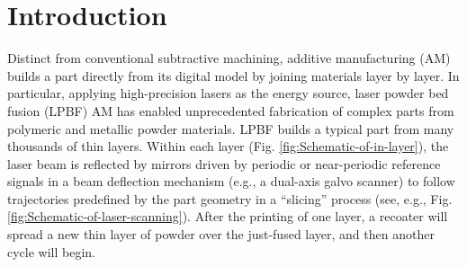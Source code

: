 \documentclass [11pt, proquest] {uwthesis}[2020/02/24]
\begin{document}
\chapter{Introduction} \label{chap:Background-and-Introduction}

Distinct from conventional subtractive machining, additive manufacturing
(AM) builds a part directly from its digital model by joining materials
layer by layer. In particular, applying high-precision lasers as the energy source, laser powder bed fusion (LPBF) AM has enabled
unprecedented fabrication of complex parts from polymeric and metallic
powder materials. LPBF builds a typical part from many thousands of thin layers. Within
each layer (Fig. \ref{fig:Schematic-of-in-layer}), the laser beam is reflected by mirrors driven by periodic or near-periodic reference signals in a beam deflection mechanism (e.g., a dual-axis
galvo scanner) to follow trajectories predefined by the part geometry
in a ``slicing'' process (see, e.g., Fig. \ref{fig:Schematic-of-laser-scanning}). After the printing of one layer, a recoater
will spread a new thin layer of powder over the just-fused layer,
and then another cycle will begin.
\end{document}
